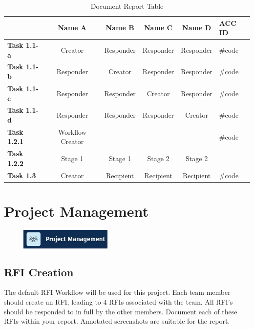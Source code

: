 \begin{table}[ht]
	\centering
	\begin{tabular}{|l|c|c|c|c|l|}
		\hline
		& \textbf{Name A} & \textbf{Name B} & \textbf{Name C} & \textbf{Name D} & \textbf{ACC ID}\\
		\hline
		\textbf{Task 1.1-a} & Creator & Responder & Responder & Responder & \#code\\
		\textbf{Task 1.1-b} & Responder & Creator & Responder & Responder & \#code\\
		\textbf{Task 1.1-c} & Responder & Responder & Creator & Responder & \#code\\
		\textbf{Task 1.1-d} & Responder & Responder & Responder & Creator & \#code\\
		\hline
		\textbf{Task 1.2.1} & Workflow Creator &  &  &  & \#code\\
		\textbf{Task 1.2.2} & Stage 1 & Stage 1 & Stage 2 & Stage 2 & \\
		\hline
		\textbf{Task 1.3} & Creator & Recipient & Recipient & Recipient & \#code\\
		\hline
	\end{tabular}
	\caption{Document Report Table }
	\label{tab:docs-items}
\end{table}





\newpage

\section{Project Management}

\begin{figure}[h!t]
	\includegraphics[height=1.0cm]{RevitAssets/projmgmt}
	\label{fig:projmgmt}
\end{figure}



\subsection{RFI Creation}
The default RFI Workflow will be used for this project.  Each team member should create an RFI, leading to 4 RFIs associated with the team.  All RFI's should be responded to in full by the other members.  Document each of these RFIs within your report. Annotated screenshots are suitable for the report. 

